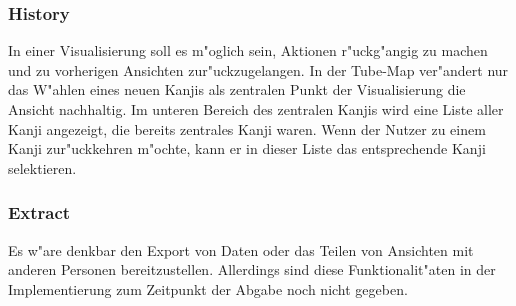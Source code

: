 \subsubsection{History}
In einer Visualisierung soll es m"oglich sein, Aktionen r"uckg"angig zu machen und zu vorherigen Ansichten zur"uckzugelangen. In der Tube-Map ver"andert nur das W"ahlen eines neuen Kanjis als zentralen Punkt der Visualisierung die Ansicht nachhaltig. Im unteren Bereich des zentralen Kanjis wird eine Liste aller Kanji angezeigt, die bereits zentrales Kanji waren. Wenn der Nutzer zu einem Kanji zur"uckkehren m"ochte, kann er in dieser Liste das entsprechende Kanji selektieren.

\subsubsection{Extract}
Es w"are denkbar den Export von Daten oder das Teilen von Ansichten mit anderen Personen bereitzustellen. Allerdings sind diese Funktionalit"aten in der Implementierung zum Zeitpunkt der Abgabe noch nicht gegeben. 
